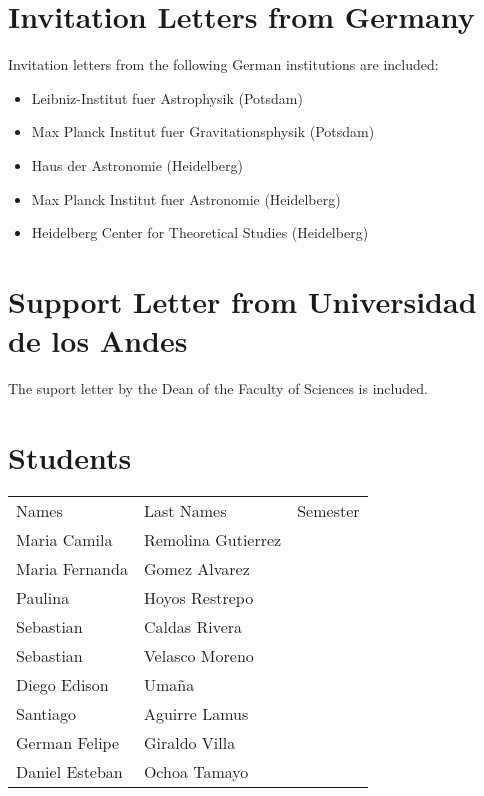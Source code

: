 \documentclass[12pt]{article}
\begin{document}
\section{Invitation Letters from Germany}
Invitation letters from the following German institutions are included:

\begin{itemize}
\item Leibniz-Institut fuer Astrophysik (Potsdam)
\item Max Planck Institut fuer Gravitationsphysik (Potsdam)
\item Haus der Astronomie (Heidelberg)
\item Max Planck Institut fuer Astronomie (Heidelberg)
\item Heidelberg Center for Theoretical Studies (Heidelberg)
\end{itemize}

\section{Support Letter from Universidad de los Andes}
The suport letter by the Dean of the Faculty of Sciences is included.

\section{Students}

\begin{tabular}{lll}
Names & Last Names & Semester \\
Maria Camila & Remolina Gutierrez & \\
Maria Fernanda & Gomez Alvarez & \\ 
Paulina & Hoyos Restrepo& \\
Sebastian & Caldas Rivera & \\
Sebastian & Velasco Moreno & \\
Diego Edison & Uma\~na & \\
Santiago & Aguirre Lamus & \\
German Felipe & Giraldo Villa & \\
Daniel Esteban & Ochoa Tamayo & \\
\end{tabular}
\end{document}
